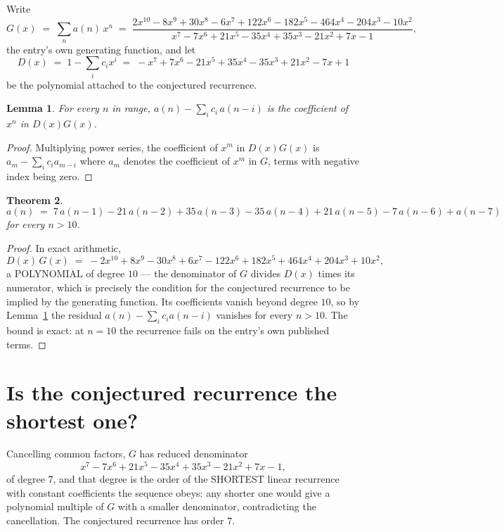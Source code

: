 \documentclass[11pt,a4paper]{article}
\theoremstyle{plain}
\newtheorem{theorem}{Theorem}
\newtheorem{lemma}[theorem]{Lemma}
\theoremstyle{definition}
\begin{document}
Write
\[
G(x)\;=\;\sum_{n}a(n)\,x^{n}\;=\;\frac{2 x^{10} - 8 x^{9} + 30 x^{8} - 6 x^{7} + 122 x^{6} - 182 x^{5} - 464 x^{4} - 204 x^{3} - 10 x^{2}}{x^{7} - 7 x^{6} + 21 x^{5} - 35 x^{4} + 35 x^{3} - 21 x^{2} + 7 x - 1},
\]
the entry's own generating function, and let
\[
D(x)\;=\;1-\sum_i c_i x^{i}\;=\;- x^{7} + 7 x^{6} - 21 x^{5} + 35 x^{4} - 35 x^{3} + 21 x^{2} - 7 x + 1
\]
be the polynomial attached to the conjectured recurrence.

\begin{lemma}\label{lem:key}
For every $n$ in range, $a(n)-\sum_i c_i\,a(n-i)$ is the coefficient of $x^{n}$ in
$D(x)G(x)$.
\end{lemma}

\begin{proof}
Multiplying power series, the coefficient of $x^{m}$ in $D(x)G(x)$ is
$a_m-\sum_i c_i a_{m-i}$ where $a_m$ denotes the coefficient of $x^{m}$ in $G$, terms with
negative index being zero.
\end{proof}

\begin{theorem}
\[
a(n)\;=\;7\,a(n-1) - 21\,a(n-2) + 35\,a(n-3) - 35\,a(n-4) + 21\,a(n-5) - 7\,a(n-6) + a(n-7)
\]
for every $n>10$.
\end{theorem}

\begin{proof}
In exact arithmetic,
\[
D(x)\,G(x)\;=\;- 2 x^{10} + 8 x^{9} - 30 x^{8} + 6 x^{7} - 122 x^{6} + 182 x^{5} + 464 x^{4} + 204 x^{3} + 10 x^{2},
\]
a POLYNOMIAL of degree $10$ --- the denominator of $G$ divides $D(x)$ times its numerator,
which is precisely the condition for the conjectured recurrence to be implied by the
generating function. Its coefficients vanish beyond degree $10$, so by
Lemma~\ref{lem:key} the residual $a(n)-\sum_ic_ia(n-i)$ vanishes for every
$n>10$. The bound is exact: at $n=10$ the recurrence fails on the entry's own published terms.
\end{proof}

\section{Is the conjectured recurrence the shortest one?}

Cancelling common factors, $G$ has reduced denominator
\[
x^{7} - 7 x^{6} + 21 x^{5} - 35 x^{4} + 35 x^{3} - 21 x^{2} + 7 x - 1,
\]
of degree $7$, and that degree is the order of the SHORTEST linear recurrence with
constant coefficients the sequence obeys: any shorter one would give a polynomial multiple of
$G$ with a smaller denominator, contradicting the cancellation. The conjectured recurrence has
order $7$.
\end{document}
